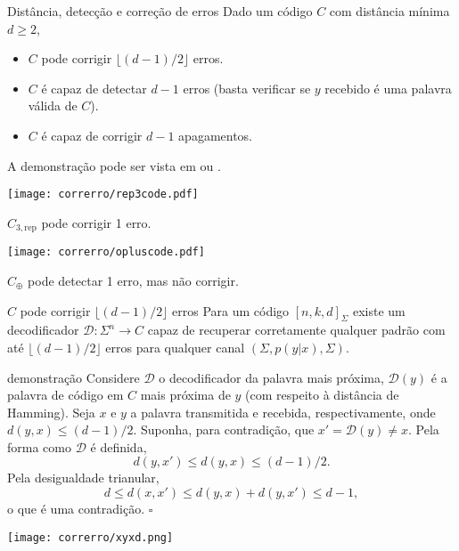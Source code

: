 \begin{frame}[allowframebreaks]
  \framebreak
  \begin{block}{Distância, detecção e correção de erros}
    Dado um código $C$ com distância mínima $d \geq 2$,
    \begin{itemize}
      \item $C$ pode corrigir $\lfloor (d-1)/2 \rfloor$ erros.
      \item $C$ é capaz de detectar $d-1$ erros (basta verificar se $y$ recebido é uma palavra válida de $C$).
      \item $C$ é capaz de corrigir $d-1$ apagamentos.
    \end{itemize}
    A demonstração pode ser vista em \cite{guruswami2023} ou \cite{roth2006}.
  \end{block}


  \noindent\begin{minipage}{.5\linewidth}
    \texttt{[image: correrro/rep3code.pdf]}

    $C_{3,\text{rep}}$ pode corrigir 1 erro.
  \end{minipage}%
  \begin{minipage}{.5\linewidth}
    \texttt{[image: correrro/opluscode.pdf]}

    $C_{\oplus}$ pode detectar 1 erro, mas não corrigir.
  \end{minipage}
 

  \framebreak

  \begin{block}{$C$ pode corrigir $\lfloor (d-1)/2 \rfloor$ erros}
    Para um código $[n,k,d]_\Sigma$ existe um decodificador $\mathcal{D}: \Sigma^n \rightarrow C$ 
    capaz de recuperar corretamente qualquer padrão com até $\lfloor (d-1)/2 \rfloor$ erros para
    qualquer canal $(\Sigma, p(y|x), \Sigma)$. 
  \end{block}

  \framebreak
  \begin{block}{demonstração}
    Considere $\mathcal{D}$ o decodificador da palavra mais próxima, $\mathcal{D}(y)$ é a palavra
    de código em $C$ mais próxima de $y$ (com respeito à distância de Hamming). Seja $x$ e $y$ a
    palavra transmitida e recebida, respectivamente, onde $d(y,x) \leq (d-1)/2$. Suponha, para contradição,
    que $x' = \mathcal{D}(y) \neq x$. Pela forma como $\mathcal{D}$ é definida,
    \begin{equation}
      d(y,x') \leq d(y,x) \leq (d-1)/2.
    \end{equation}
    Pela desigualdade trianular,
    \begin{equation}
      d \leq d(x,x') \leq d(y,x) + d(y,x') \leq d-1,
    \end{equation}
    o que é uma contradição. $\square$
  \end{block}
  \begin{center}
    \texttt{[image: correrro/xyxd.png]}
  \end{center}


\end{frame}
